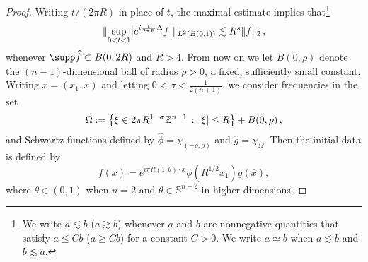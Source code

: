 \documentclass[biblatex]{pzorin-note}
\begin{document}
\begin{proof}
Writing $t/(2\pi R)$ in place of $t$, the maximal estimate implies that\footnote{We write $a\lesssim b$ ($a\gtrsim b$) whenever $a$ and $b$ are nonnegative quantities that satisfy $a \leq C b$ ($a \geq C b$) for a constant $C > 0$. We write $a\simeq b$ when $a\lesssim b$ and $b\lesssim a$.}
\begin{equation}\label{otooBis0}
\norm{ \sup_{0<t<1} \abs[\big]{ e^{i\frac{t}{2\pi R}\Delta} f } }_{L^{2}(B(0,1))} \lesssim R^s\norm{ f }_{2} \, ,
\end{equation}
whenever $\supp \widehat{f} \subset B(0,2R)$ and $R>4$. From now on we let $B(0,\rho)$ denote the $(n-1)$-dimensional ball of radius $\rho>0$, a fixed, sufficiently small constant.
Writing $x=(x_1,\bar{x})$ and letting $0 < \sigma < \frac{1}{2(n+1)}$, we consider frequencies in the set
\begin{equation}\nonumber
\Omega := \big\{ \bar{\xi}\in 2\pi R^{1-\sigma} \mathbb{Z}^{n-1} \,:\, \abs{\bar{\xi}}\le R \big\} + B(0,\rho) \,,
\end{equation}
and Schwartz functions defined by $\widehat{\phi}=\chi_{(-\rho,\rho)}$ and
$\widehat{g} =\chi_{\Omega}$. Then the initial data is defined by
\begin{equation}\label{fg}
f(x)= e^{i\pi R(1,\theta)\cdot x}\phi(R^{1/2}x_1)g(\bar{x}),
\end{equation}
where $\theta \in (0,1)$ when $n=2$ and $\theta \in \mathbb{S}^{n-2}$ in higher dimensions.


\end{proof}
\end{document}
